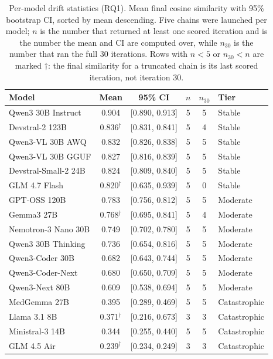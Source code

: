 \begin{table}[t]
\centering
\caption{Per-model drift statistics (RQ1). Mean final cosine similarity
  with 95\% bootstrap CI, sorted by mean descending. Five chains were
  launched per model; $n$ is the number that returned at least one scored
  iteration and is the number the mean and CI are computed over, while
  $n_{30}$ is the number that ran the full 30 iterations. Rows with
  $n<5$ or $n_{30}<n$ are marked $\dagger$: the final similarity for a
  truncated chain is its last scored iteration, not iteration 30.}
\label{tab:rq1}
\small
\begin{tabular}{lccccl}
\toprule
Model & Mean & 95\% CI & $n$ & $n_{30}$ & Tier \\
\midrule
Qwen3 30B Instruct & 0.904 & [0.890, 0.913] & 5 & 5 & Stable \\
Devstral-2 123B & 0.836$^\dagger$ & [0.831, 0.841] & 5 & 4 & Stable \\
Qwen3-VL 30B AWQ & 0.832 & [0.826, 0.838] & 5 & 5 & Stable \\
Qwen3-VL 30B GGUF & 0.827 & [0.816, 0.839] & 5 & 5 & Stable \\
Devstral-Small-2 24B & 0.824 & [0.809, 0.840] & 5 & 5 & Stable \\
GLM 4.7 Flash & 0.820$^\dagger$ & [0.635, 0.939] & 5 & 0 & Stable \\
\midrule
GPT-OSS 120B & 0.783 & [0.756, 0.812] & 5 & 5 & Moderate \\
Gemma3 27B & 0.768$^\dagger$ & [0.695, 0.841] & 5 & 4 & Moderate \\
Nemotron-3 Nano 30B & 0.749 & [0.702, 0.780] & 5 & 5 & Moderate \\
Qwen3 30B Thinking & 0.736 & [0.654, 0.816] & 5 & 5 & Moderate \\
Qwen3-Coder 30B & 0.682 & [0.643, 0.744] & 5 & 5 & Moderate \\
Qwen3-Coder-Next & 0.680 & [0.650, 0.709] & 5 & 5 & Moderate \\
Qwen3-Next 80B & 0.609 & [0.538, 0.694] & 5 & 5 & Moderate \\
\midrule
MedGemma 27B & 0.395 & [0.289, 0.469] & 5 & 5 & Catastrophic \\
Llama 3.1 8B & 0.371$^\dagger$ & [0.216, 0.673] & 3 & 3 & Catastrophic \\
Ministral-3 14B & 0.344 & [0.255, 0.440] & 5 & 5 & Catastrophic \\
GLM 4.5 Air & 0.239$^\dagger$ & [0.234, 0.249] & 3 & 3 & Catastrophic \\
\bottomrule
\end{tabular}
\end{table}
